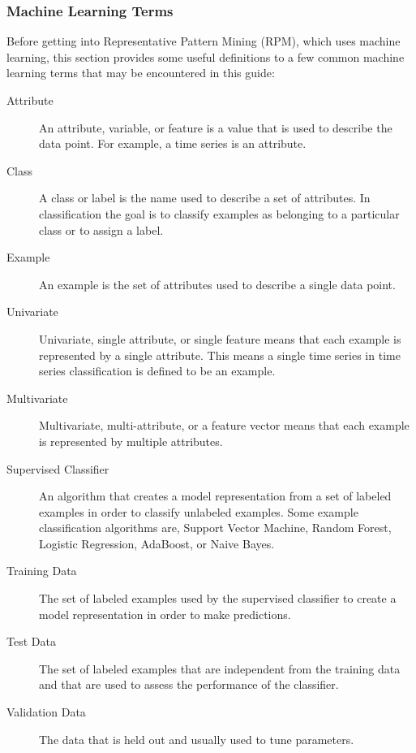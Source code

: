 \documentclass[titlepage, letterpaper, 12pt]{article}
\begin{document}
\subsubsection{Machine Learning Terms}
\label{MLTerms}

Before getting into Representative Pattern Mining (RPM), which uses machine learning, this section provides some useful definitions to a few common machine learning terms that may be encountered in this guide:

\begin{description}
	\item[Attribute] An attribute, variable, or feature is a value that is used to describe the data point.  For example, a time series is an attribute.
	\item[Class] A class or label is the name used to describe a set of attributes.  In classification the goal is to classify examples as belonging to a particular class or to assign a label.
	\item[Example] An example is the set of attributes used to describe a single data point.
	\item[Univariate] Univariate, single attribute, or single feature means that each example is represented by a single attribute.  This means a single time series in time series classification is defined to be an example.
	\item[Multivariate] Multivariate, multi-attribute, or a feature vector means that each example is represented by multiple attributes.
	\item[Supervised Classifier] An algorithm that creates a model representation from a set of labeled examples in order to classify unlabeled examples.  Some example classification algorithms are, Support Vector Machine, Random Forest, Logistic Regression, AdaBoost, or Naive Bayes.
	\item[Training Data] The set of labeled examples used by the supervised classifier to create a model representation in order to make predictions.
	\item[Test Data] The set of labeled examples that are independent from the training data and that are used to assess the performance of the classifier.
	\item[Validation Data] The data that is held out and usually used to tune parameters.
\end{description}
\end{document}
